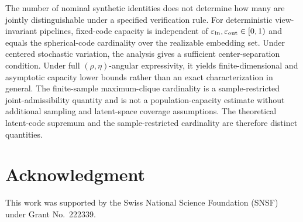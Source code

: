 \documentclass[journal]{IEEEtran}
\makeatletter
\let\lpgrand@original@section\section
\newcommand{\AppendixOnlyTOC}{%
  \lpgrand@original@section*{Appendix Contents}%
  \begingroup
    \footnotesize
    \setcounter{tocdepth}{2}%
    \setlength{\parskip}{0pt}%
    \@starttoc{atoc}%
  \endgroup
  \let\section\lpgrand@section
  \let\subsection\lpgrand@subsection
}
\makeatother
\begin{document}
\begin{bibunit}
The number of nominal synthetic identities does not determine how many are jointly distinguishable under a specified verification rule. For deterministic view-invariant pipelines, fixed-code capacity is independent
of $\varepsilon_{\rm in},\varepsilon_{\rm out}\in[0,1)$ and equals the spherical-code cardinality over the realizable embedding set. Under centered stochastic variation, the analysis gives a sufficient
center-separation condition. Under full $(\rho,\eta)$-angular expressivity, it yields finite-dimensional and asymptotic capacity lower bounds rather than an exact characterization in general. The finite-sample maximum-clique cardinality is a sample-restricted joint-admissibility quantity and is not a population-capacity estimate without additional sampling and latent-space coverage assumptions. The theoretical latent-code supremum and the sample-restricted cardinality are therefore distinct quantities.

\vspace{-5pt}

\section*{Acknowledgment}

This work was supported by the Swiss National Science Foundation (SNSF) under Grant No.~222339. 


 
% 
% 


\vspace{-5pt}

\putbib
\end{bibunit}




 


\clearpage
\appendices 


\end{document}
